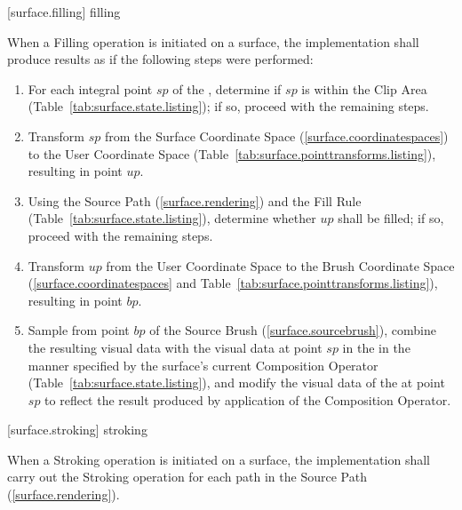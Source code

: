  [surface.filling] { filling}

\pnum
When a Filling operation is initiated on a surface, the implementation shall produce results as if the following steps were performed:

\begin{enumerate}
\item For each integral point $sp$ of the \underlyingsurface, determine if $sp$ is within the Clip Area (Table~\ref{tab:surface.state.listing}); if so, proceed with the remaining steps.
\item Transform $sp$ from the Surface Coordinate Space (\ref{surface.coordinatespaces}) to the User Coordinate Space (Table~\ref{tab:surface.pointtransforms.listing}), resulting in point $up$.
\item Using the Source Path (\ref{surface.rendering}) and the Fill Rule (Table~\ref{tab:surface.state.listing}), determine whether $up$ shall be filled; if so, proceed with the remaining steps.
\item Transform $up$ from the User Coordinate Space to the Brush Coordinate Space (\ref{surface.coordinatespaces} and Table~\ref{tab:surface.pointtransforms.listing}), resulting in point $bp$.
\item Sample from point $bp$ of the Source Brush (\ref{surface.sourcebrush}), combine the resulting visual data with the visual data at point $sp$ in the \underlyingsurface in the manner specified by the surface's current Composition Operator (Table~\ref{tab:surface.state.listing}), and modify the visual data of the \underlyingsurface at point $sp$ to reflect the result produced by application of the Composition Operator.
\end{enumerate}

 [surface.stroking] { stroking}

\pnum
When a Stroking operation is initiated on a surface, the implementation shall carry out the Stroking operation for each path in the Source Path (\ref{surface.rendering}).

